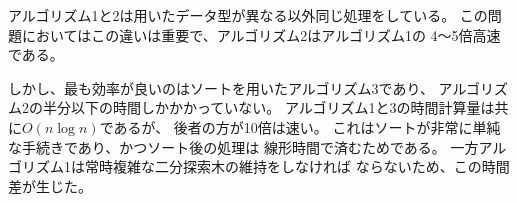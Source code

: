アルゴリズム1と2は用いたデータ型が異なる以外同じ処理をしている。
この問題においてはこの違いは重要で、アルゴリズム2はアルゴリズム1の
4～5倍高速である。

しかし、最も効率が良いのはソートを用いたアルゴリズム3であり、
アルゴリズム2の半分以下の時間しかかかっていない。
アルゴリズム1と3の時間計算量は共に$O(n \log n)$であるが、
後者の方が10倍は速い。
これはソートが非常に単純な手続きであり、かつソート後の処理は
線形時間で済むためである。
一方アルゴリズム1は常時複雑な二分探索木の維持をしなければ
ならないため、この時間差が生じた。
